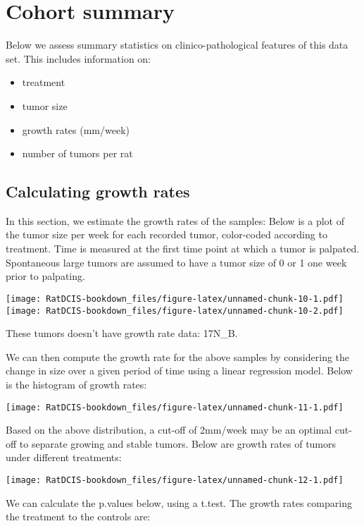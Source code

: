 \documentclass[
]{book}
\providecommand{\tightlist}{%
  \setlength{\itemsep}{0pt}\setlength{\parskip}{0pt}}
\begin{document}
\hypertarget{intro}{%
\chapter{Cohort summary}\label{intro}}

Below we assess summary statistics on clinico-pathological features of this data set. This includes information on:

\begin{itemize}
\tightlist
\item
  treatment
\item
  tumor size
\item
  growth rates (mm/week)
\item
  number of tumors per rat
\end{itemize}

\hypertarget{calculating-growth-rates}{%
\section{Calculating growth rates}\label{calculating-growth-rates}}

In this section, we estimate the growth rates of the samples: Below is a plot of the tumor size per week for each recorded tumor, color-coded according to treatment. Time is measured at the first time point at which a tumor is palpated. Spontaneous large tumors are assumed to have a tumor size of 0 or 1 one week prior to palpating.

\texttt{[image: RatDCIS-bookdown\_files/figure-latex/unnamed-chunk-10-1.pdf]} \texttt{[image: RatDCIS-bookdown\_files/figure-latex/unnamed-chunk-10-2.pdf]}

These tumors doesn't have growth rate data: 17N\_B.

We can then compute the growth rate for the above samples by considering the change in size over a given period of time using a linear regression model. Below is the histogram of growth rates:

\texttt{[image: RatDCIS-bookdown\_files/figure-latex/unnamed-chunk-11-1.pdf]}

Based on the above distribution, a cut-off of 2mm/week may be an optimal cut-off to separate growing and stable tumors. Below are growth rates of tumors under different treatments:

\texttt{[image: RatDCIS-bookdown\_files/figure-latex/unnamed-chunk-12-1.pdf]}

We can calculate the p.values below, using a t.test. The growth rates comparing the treatment to the controls are:
\end{document}

